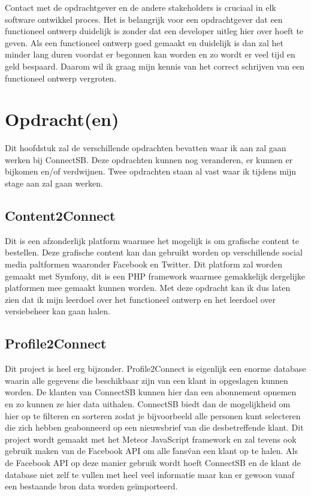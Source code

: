 \documentclass{article}
\begin{document}
Contact met de opdrachtgever en de andere stakeholders is cruciaal in elk software ontwikkel proces. Het is belangrijk voor een opdrachtgever dat een functioneel ontwerp duidelijk is zonder dat een developer uitleg hier over hoeft te geven. Als een functioneel ontwerp goed gemaakt en duidelijk is dan zal het minder lang duren voordat er begonnen kan worden en zo wordt er veel tijd en geld bespaard. Daarom wil ik graag mijn kennis van het correct schrijven van een functioneel ontwerp vergroten.

\clearpage



\section{Opdracht(en)}
Dit hoofdstuk zal de verschillende opdrachten bevatten waar ik aan zal gaan werken bij ConnectSB. Deze opdrachten kunnen nog veranderen, er kunnen er bijkomen en/of verdwijnen. Twee opdrachten staan al vast waar ik tijdens mijn stage aan zal gaan werken.

\subsection{Content2Connect}
Dit is een afzonderlijk platform waarmee het mogelijk is om grafische content te bestellen. Deze grafische content kan dan gebruikt worden op verschillende social media paltformen waaronder Facebook en Twitter. Dit platform zal worden gemaakt met Symfony, dit is een PHP framework waarmee gemakkelijk dergelijke platformen mee gemaakt kunnen worden. Met deze opdracht kan ik dus laten zien dat ik mijn leerdoel over het functioneel ontwerp en het leerdoel over versiebeheer kan gaan halen.

\subsection{Profile2Connect}
Dit project is heel erg bijzonder. Profile2Connect is eigenlijk een enorme database waarin alle gegevens die beschikbaar zijn van een klant in opgeslagen kunnen worden. De klanten van ConnectSB kunnen hier dan een abonnement opnemen en zo kunnen ze hier data uithalen. ConnectSB biedt dan de mogelijkheid om hier op te filteren en sorteren zodat je bijvoorbeeld alle personen kunt selecteren die zich hebben geabonneerd op een nieuwsbrief van die desbetreffende klant. Dit project wordt gemaakt met het Meteor JavaScript framework en zal tevens ook gebruik maken van de Facebook API om alle \'fans\' van een klant op te halen. Als de Facebook API op deze manier gebruik wordt hoeft ConnectSB en de klant de database niet zelf te vullen met heel veel informatie maar kan er gewoon vanaf een bestaande bron data worden geïmporteerd.
\end{document}
